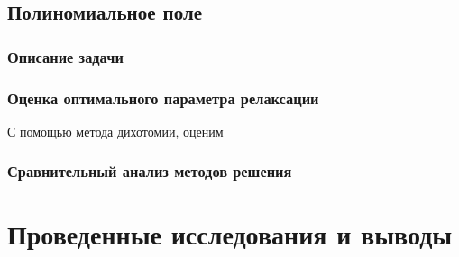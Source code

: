 \documentclass[12pt]{article}
\begin{document}
\subsection{Полиномиальное поле}

\subsubsection{Описание задачи}

\subsubsection{Оценка оптимального параметра релаксации}

\noindent
С помощью метода дихотомии, оценим 

\subsubsection{Сравнительный анализ методов решения}

\section{Проведенные исследования и выводы}
\end{document}
